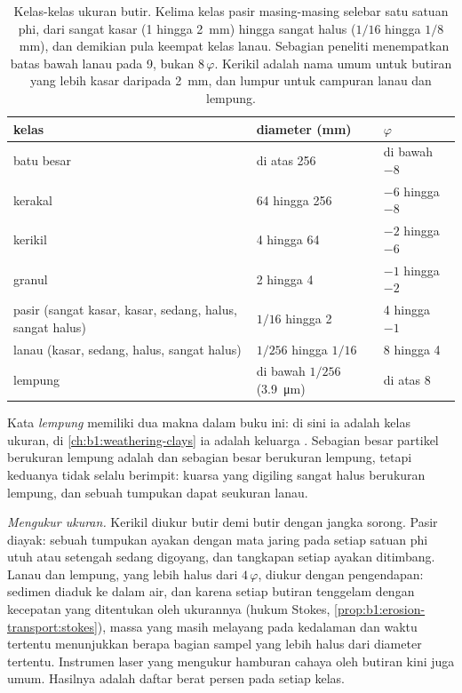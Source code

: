 \begin{table}[htbp]
\centering\small
\begin{tabular}{@{}lll@{}}
\hline
kelas & diameter (\si{mm}) & $\varphi$ \\
\hline
batu besar & di atas 256 & di bawah $-8$ \\
kerakal & 64 hingga 256 & $-6$ hingga $-8$ \\
kerikil & 4 hingga 64 & $-2$ hingga $-6$ \\
granul & 2 hingga 4 & $-1$ hingga $-2$ \\
pasir (sangat kasar, kasar, sedang, halus, sangat halus) & $1/16$ hingga 2 & 4 hingga $-1$ \\
lanau (kasar, sedang, halus, sangat halus) & $1/256$ hingga $1/16$ & 8 hingga 4 \\
lempung & di bawah $1/256$ (\qty{3.9}{\micro m}) & di atas 8 \\
\hline
\end{tabular}
\caption{Kelas-kelas ukuran butir. Kelima kelas pasir masing-masing selebar satu satuan phi, dari sangat kasar (1 hingga \qty{2}{mm}) hingga sangat halus ($1/16$ hingga $1/8$~mm), dan demikian pula keempat kelas lanau. Sebagian peneliti menempatkan batas bawah lanau pada 9, bukan $8\,\varphi$. Kerikil adalah nama umum untuk butiran yang lebih kasar daripada \qty{2}{mm}, dan lumpur untuk campuran lanau dan lempung.}
\label{tab:b1:clastic-sediments:classes}
\end{table}

Kata \emph{lempung} memiliki dua makna dalam buku ini: di sini ia adalah kelas ukuran, di \cref{ch:b1:weathering-clays} ia adalah keluarga . Sebagian besar partikel berukuran lempung adalah  dan sebagian besar  berukuran lempung, tetapi keduanya tidak selalu berimpit: kuarsa yang digiling sangat halus berukuran lempung, dan sebuah tumpukan  dapat seukuran lanau.

\emph{Mengukur ukuran.} Kerikil diukur butir demi butir dengan jangka sorong. Pasir diayak: sebuah tumpukan ayakan dengan mata jaring pada setiap satuan phi utuh atau setengah sedang digoyang, dan tangkapan setiap ayakan ditimbang. Lanau dan lempung, yang lebih halus dari $4\,\varphi$, diukur dengan pengendapan: sedimen diaduk ke dalam air, dan karena setiap butiran tenggelam dengan kecepatan yang ditentukan oleh ukurannya (hukum Stokes, \cref{prop:b1:erosion-transport:stokes}), massa yang masih melayang pada kedalaman dan waktu tertentu menunjukkan berapa bagian sampel yang lebih halus dari diameter tertentu. Instrumen laser yang mengukur hamburan cahaya oleh butiran kini juga umum. Hasilnya adalah daftar berat persen pada setiap kelas.

